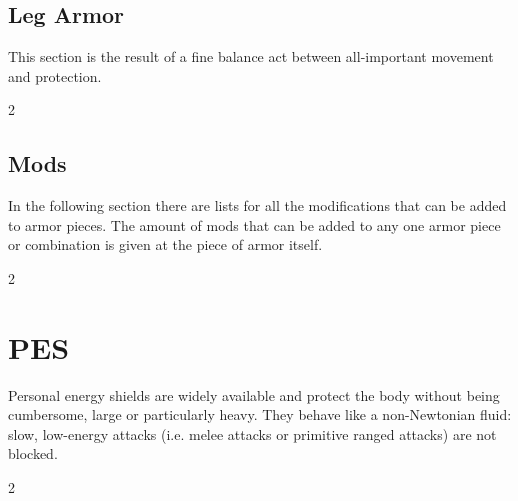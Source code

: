 \subsection{Leg Armor}
This section is the result of a fine balance act between all-important movement and protection.\par
\begin{multicols}{2}
\end{multicols}

\subsection{Mods}
\label{subsec:armormod}
In the following section there are lists for all the modifications that can be added to armor pieces. The amount of mods that can be added to any one armor piece or combination is given at the piece of armor itself.
\par
\vspace{2mm}
\begin{multicols}{2}
\end{multicols}

\section{PES}
Personal energy shields are widely available
	and protect the body without being cumbersome,
	large or particularly heavy.
They behave like a non-Newtonian fluid:
	slow, low-energy attacks (i.e. melee attacks or primitive ranged attacks) are not blocked.
\par%
\vspace*{3mm}
\begin{multicols}{2}
\end{multicols}
